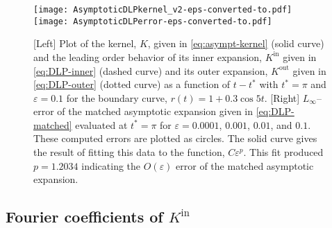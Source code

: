 \documentclass{article}[12pt]
\renewcommand{\epsilon}{\varepsilon}
\numberwithin{equation}{section}
\begin{document}
\begin{figure}[t]
  \centering
   \texttt{[image: AsymptoticDLPkernel\_v2-eps-converted-to.pdf]}
  \texttt{[image: AsymptoticDLPerror-eps-converted-to.pdf]}
  \caption{[Left] Plot of the kernel, $K$, given in
    \eqref{eq:asympt-kernel} (solid curve) and the leading order
    behavior of its inner expansion, $K^{\text{in}}$ given in
    \eqref{eq:DLP-inner} (dashed curve) and its outer expansion,
    $K^{\text{out}}$ given in \eqref{eq:DLP-outer} (dotted curve) as a
    function of $t - t^{\ast}$ with $t^{\ast} = \pi$ and
    $\epsilon = 0.1$ for the boundary curve,
    $r(t) = 1 + 0.3 \cos 5 t$. [Right] $L_{\infty}$--error of the
    matched asymptotic expansion given in \eqref{eq:DLP-matched}
    evaluated at $t^{\ast} = \pi$ for $\epsilon = 0.0001$, $0.001$,
    $0.01$, and $0.1$. These computed errors are plotted as
    circles. The solid curve gives the result of fitting this data to
    the function, $C \epsilon^{p}$.  This fit produced $p = 1.2034$
    indicating the $O(\epsilon)$ error of the matched asymptotic
    expansion.}
  \label{fig:4}
\end{figure}

\subsection{Fourier coefficients of $K^{\text{in}}$}
\end{document}
